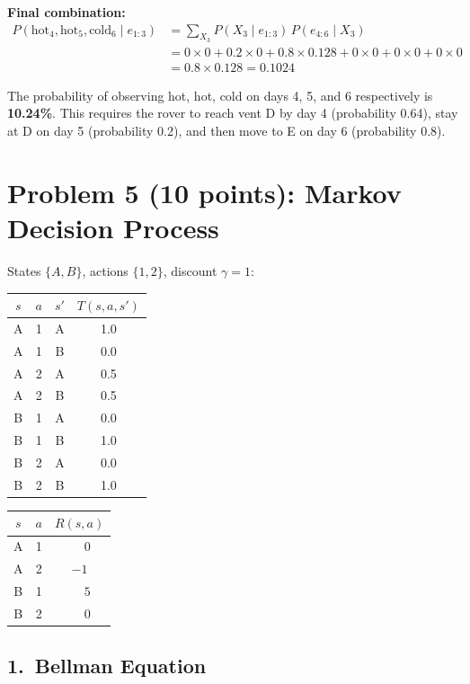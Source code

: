 \documentclass[12pt]{article}
\begin{document}
\textbf{Final combination:}
\begin{align*}
P(\text{hot}_4,\text{hot}_5,\text{cold}_6\mid e_{1:3})
&=\sum_{X_3}P(X_3\mid e_{1:3})\,P(e_{4:6}\mid X_3)\\
&=0\times0+0.2\times0+0.8\times0.128+0\times0+0\times0+0\times0\\
&=0.8\times0.128=\boxed{0.1024}
\end{align*}

The probability of observing hot, hot, cold on days 4, 5, and 6 respectively is \textbf{10.24\%}.
This requires the rover to reach vent D by day 4 (probability 0.64), stay at D on day 5
(probability 0.2), and then move to E on day 6 (probability 0.8).

\newpage
\section{Problem 5 (10 points): Markov Decision Process}

States $\{A,B\}$, actions $\{1,2\}$, discount $\gamma=1$:

\begin{center}
\begin{tabular}{cccc}
\toprule
$s$ & $a$ & $s'$ & $T(s,a,s')$\\
\midrule
A & 1 & A & 1.0\\ A & 1 & B & 0.0\\
A & 2 & A & 0.5\\ A & 2 & B & 0.5\\
B & 1 & A & 0.0\\ B & 1 & B & 1.0\\
B & 2 & A & 0.0\\ B & 2 & B & 1.0\\
\bottomrule
\end{tabular}
\qquad
\begin{tabular}{ccc}
\toprule
$s$ & $a$ & $R(s,a)$\\
\midrule
A & 1 & $\phantom{-}0$\\
A & 2 & $-1$\\
B & 1 & $\phantom{-}5$\\
B & 2 & $\phantom{-}0$\\
\bottomrule
\end{tabular}
\end{center}

\subsection*{1.\ Bellman Equation}
\end{document}
